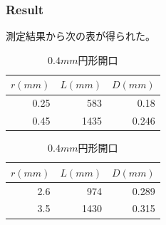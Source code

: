 \documentclass[11pt, a4paper]{jsarticle}
\begin{document}
\subsubsection{Result}
測定結果から次の表が得られた。
\begin{table}[htb]
 \begin{minipage}{0.45\hsize}
  \begin{center}
    \caption{$0.2mm$円形開口}
    \begin{tabular}{rrr} \hline
        $r(mm)$ & $L(mm)$ & $D(mm)$  \\ \hline
        0.25     & 583 & 0.18\\
        0.45    & 1435 & 0.246\\ \hline
    \end{tabular}
    \label{tab:b}
  \end{center}
 \end{minipage}
 \begin{minipage}{0.45\hsize}
  \begin{center}
    \caption{$0.4mm$円形開口}
    \begin{tabular}{rrr} \hline
        $r(mm)$ & $L(mm)$ & $D(mm)$  \\ \hline
        2.6   & 974 & 0.289\\
        3.5    & 1430 & 0.315\\ \hline
    \end{tabular}
    \label{tab:c}
  \end{center}
 \end{minipage}
\end{table}　
\newpage
\end{document}

